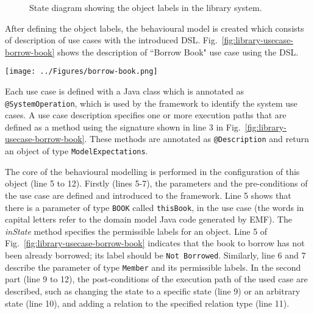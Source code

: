 \begin{figure}[h]
\centering
{}
\hfil
{}
\caption{State diagram showing the object labels in the library system.}
\label{fig:library-object-labels}
\end{figure} 

After defining the object labels, the behavioural model is created which consists of description of use cases with the introduced DSL. Fig.~\ref{fig:library-usecase-borrow-book} shows the description of ``Borrow Book" use case using the DSL. 

\begin{figure*}[h]
\centering
\texttt{[image: ../Figures/borrow-book.png]}
\caption{The behavioural modelling for ``Borrow Book" use case using our DSL.}
\label{fig:library-usecase-borrow-book}
\end{figure*}

Each use case is defined with a Java class which is annotated as \texttt{@SystemOperation}, which is used by the framework to identify the system use cases. A use case description specifies one or more execution paths that are defined as a method using the signature shown in line 3 in Fig.~\ref{fig:library-usecase-borrow-book}. These methods are annotated as \texttt{@Description} and return an object of type \texttt{ModelExpectations}. 

The core of the behavioural modelling is performed in the configuration of this object (line 5 to 12). Firstly (lines 5-7), the parameters and the pre-conditions of the use case are defined and introduced to the framework. Line 5 shows that there is a parameter of type \texttt{BOOK} called \texttt{thisBook}, in the use case (the words in capital letters refer to the domain model Java code generated by EMF). The \textit{inState} method specifies the permissible labels for an object. Line 5 of Fig.~\ref{fig:library-usecase-borrow-book} indicates that the book to borrow has not been already borrowed; its label should be \texttt{Not Borrowed}. Similarly, line 6 and 7 describe the parameter of type \texttt{Member} and its permissible labels.
In the second part (line 9 to 12), the post-conditions of the execution path of the used case are described, such as changing the state to a specific state (line 9) or an arbitrary state (line 10), and adding a relation to the specified relation type (line 11). 

